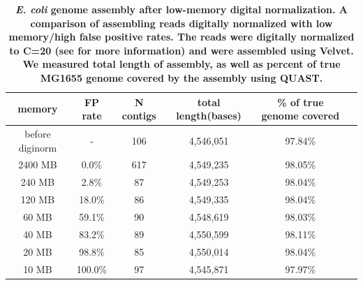 \documentclass[10pt]{article}
\begin{document}
\begin{table}[!ht]
\caption{
\bf{{\em E. coli} genome assembly after low-memory digital normalization.
  A comparison of assembling reads digitally normalized with low memory/high
  false positive rates.  The reads were digitally normalized to 
  C=20 (see
  \cite{Brown2012} for more information) and were assembled using Velvet.
  We measured total length of assembly,
  as well as percent of true MG1655 genome covered by the assembly using QUAST.}}
\begin{tabular}{ | c | c | c | c | c | c |}
\hline
memory   & FP rate & N contigs & total length(bases) & \% of true genome covered \\
\hline
before diginorm  &-   & 106 & 4,546,051 & 97.84\% \\
    2400 MB  &  0.0\% & 617 & 4,549,235 & 98.05\% \\
     240 MB  &  2.8\% &  87 & 4,549,253 & 98.04\% \\
     120 MB  & 18.0\% &  86 & 4,549,335 & 98.04\% \\
      60 MB  & 59.1\% &  90 & 4,548,619 & 98.03\% \\
      40 MB  & 83.2\% &  89 & 4,550,599 & 98.11\% \\
      20 MB  & 98.8\% &  85 & 4,550,014 & 98.04\% \\
      10 MB  &100.0\% &  97 & 4,545,871 & 97.97\% \\
\end{tabular}
\begin{flushleft}
\end{flushleft}
\label{table:assembly}
\end{table}
\end{document}
